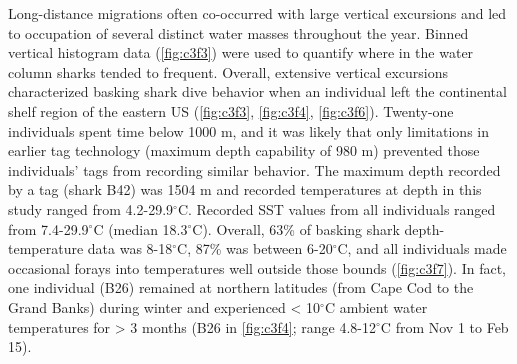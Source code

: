 Long-distance migrations often co-occurred with large vertical excursions and led to occupation of several distinct water masses throughout the year. Binned vertical histogram data (\cref{fig:c3f3}) were used to quantify where in the water column sharks tended to frequent. Overall, extensive vertical excursions characterized basking shark dive behavior when an individual left the continental shelf region of the eastern US (\cref{fig:c3f3}, \cref{fig:c3f4}, \cref{fig:c3f6}). Twenty-one individuals spent time below 1000 m, and it was likely that only limitations in earlier tag technology (maximum depth capability of 980 m) prevented those individuals' tags from recording similar behavior. The maximum depth recorded by a tag (shark B42) was 1504 m and recorded temperatures at depth in this study ranged from 4.2-29.9$^{\circ}$C. Recorded SST values from all individuals ranged from 7.4-29.9$^{\circ}$C (median 18.3$^{\circ}$C). Overall, 63\% of basking shark depth-temperature data was 8-18$^{\circ}$C, 87\% was between 6-20$^{\circ}$C, and all individuals made occasional forays into temperatures well outside those bounds (\cref{fig:c3f7}). In fact, one individual (B26) remained at northern latitudes (from Cape Cod to the Grand Banks) during winter and experienced < 10$^{\circ}$C ambient water temperatures for > 3 months (B26 in \cref{fig:c3f4}; range 4.8-12$^{\circ}$C from Nov 1 to Feb 15). 

